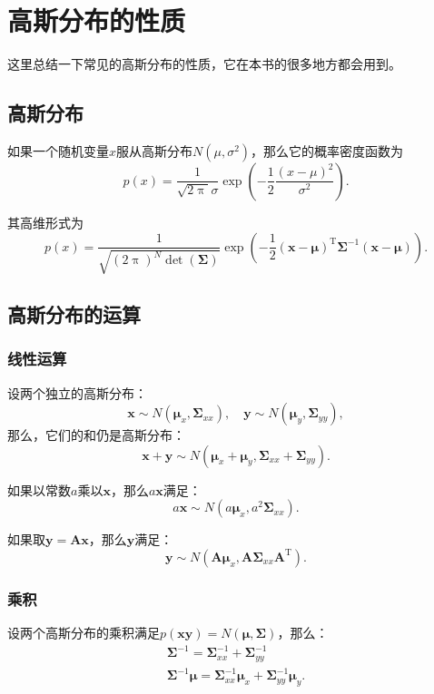 \chapter{高斯分布的性质}
这里总结一下常见的高斯分布的性质，它在本书的很多地方都会用到。
\section{高斯分布}
如果一个随机变量$x$服从高斯分布$N(\mu, \sigma^2)$，那么它的概率密度函数为
\begin{equation}
p\left( x \right) = \frac{1}{{\sqrt {2\uppi } \sigma }}\exp \left( { - \frac{1}{2}\frac{{{{\left( {x - \mu } \right)}^2}}}{{{\sigma ^2}}}} \right).
\end{equation}

其高维形式为
\begin{equation}
p\left( x \right) = \frac{1}{{\sqrt {(2\uppi)^N  \det \left( \bm{\Sigma } \right) }}}\exp \left( { - \frac{1}{2}{{\left( {\bm{x} - \bm{\mu} } \right)}^\mathrm{T}}{\bm{\Sigma} ^{ - 1}}\left( {\bm{x} - \bm{\mu} } \right)} \right).
\end{equation}

\section{高斯分布的运算}
\subsection{线性运算}
设两个独立的高斯分布：
\[
\bm{x} \sim N( \bm{\mu}_x, \bm{\Sigma}_{xx} ), \quad \bm{y} \sim N( \bm{\mu}_y, \bm{\Sigma}_{yy} ),
\]
那么，它们的和仍是高斯分布：
\begin{equation}
\bm{x}+\bm{y} \sim N( \bm{\mu}_x + \bm{\mu}_y, \bm{\Sigma}_{xx} + \bm{\Sigma}_{yy}).
\end{equation}

如果以常数$a$乘以$\bm{x}$，那么$a \bm{x}$满足：
\begin{equation}
a\bm{x} \sim N( a \bm{\mu}_x, a^2 \bm{\Sigma}_{xx}).
\end{equation}

如果取$\bm{y} = \bm{A} \bm{x}$，那么$\bm{y}$满足：
\begin{equation}
\bm{y} \sim N( \bm{A} \bm{\mu}_x, \bm{A} \bm{\Sigma}_{xx} \bm{A}^\mathrm{T}).
\end{equation}

\subsection{乘积}
设两个高斯分布的乘积满足$p\left( \bm{xy} \right) = N\left( {\bm{\mu} ,\bm{\Sigma}} \right)$，那么：
\begin{equation}
\begin{array}{l}
{\bm{\Sigma}^{-1}} = \bm{\Sigma}_{xx}^{-1} + \bm{\Sigma}_{yy}^{-1} \\
\bm{\Sigma}^{-1} \bm{\mu} = \bm{\Sigma}_{xx}^{-1}{\bm{\mu}_x} + \bm{\Sigma}_{yy}^{-1}{\bm{\mu}_y}.
\end{array}
\end{equation}

